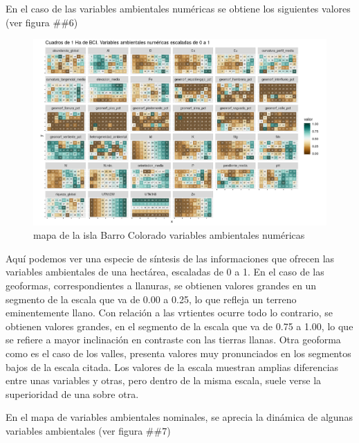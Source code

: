 \documentclass[11pt,]{article}
\begin{document}
En el caso de las variables ambientales numéricas se obtiene los
siguientes valores (ver figura \#\#6)

\begin{figure}
\centering
\includegraphics[width=1.00000\textwidth]{mapas_variables_ambientales_numericas.png}
\caption{mapa de la isla Barro Colorado variables ambientales numéricas
\label{fig:bci_map}}
\end{figure}

Aquí podemos ver una especie de síntesis de las informaciones que
ofrecen las variables ambientales de una hectárea, escaladas de 0 a 1.
En el caso de las geoformas, correspondientes a llanuras, se obtienen
valores grandes en un segmento de la escala que va de 0.00 a 0.25, lo
que refleja un terreno eminentemente llano. Con relación a las vrtientes
ocurre todo lo contrario, se obtienen valores grandes, en el segmento de
la escala que va de 0.75 a 1.00, lo que se refiere a mayor inclinación
en contraste con las tierras llanas. Otra geoforma como es el caso de
los valles, presenta valores muy pronunciados en los segmentos bajos de
la escala citada. Los valores de la escala muestran amplias diferencias
entre unas variables y otras, pero dentro de la misma escala, suele
verse la superioridad de una sobre otra.

En el mapa de variables ambientales nominales, se aprecia la dinámica de
algunas variables ambientales (ver figura \#\#7)
\end{document}
